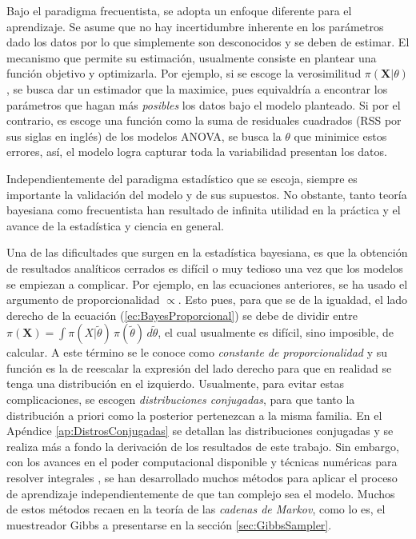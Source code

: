 \documentclass[../Main/Main.tex]{subfiles}
\begin{document}
Bajo el paradigma frecuentista, se adopta un enfoque diferente para el  aprendizaje. Se asume que no hay incertidumbre inherente en los parámetros dado los datos por lo que simplemente son desconocidos y se deben de estimar. El mecanismo que permite su estimación, usualmente consiste en plantear una función objetivo y optimizarla. Por ejemplo, si se escoge la verosimilitud $\pi(\mathbf{X}|\theta)$, se busca dar un estimador que la maximice, pues equivaldría a encontrar los parámetros que hagan más \textit{posibles} los datos bajo el modelo planteado. Si por el contrario, es escoge una función como la suma de residuales cuadrados (RSS por sus siglas en inglés) de los modelos ANOVA, se busca la $\theta$ que minimice estos errores, así, el modelo logra capturar toda la variabilidad presentan los datos. 

Independientemente del paradigma estadístico que se escoja, siempre es importante la validación del modelo y de sus supuestos. No obstante, tanto teoría bayesiana como frecuentista han resultado de infinita utilidad en la práctica y el avance de la estadística y ciencia en general.

Una de las dificultades que surgen en la estadística bayesiana, es que la obtención de resultados analíticos cerrados es difícil o muy tedioso una vez que los modelos se empiezan a complicar. Por ejemplo, en las ecuaciones anteriores, se ha usado el argumento de proporcionalidad $\propto$. Esto pues, para que se de la igualdad, el lado derecho de la ecuación (\ref{ec:BayesProporcional}) se debe de dividir entre $\pi(\mathbf{X}) = \int \pi(X|\tilde{\theta})\,\pi(\tilde{\theta})\,d\tilde{\theta}$, el cual usualmente es difícil, sino imposible, de calcular. A este término se le conoce como \textit{constante de proporcionalidad} y su función es la de reescalar la expresión del lado derecho para que en realidad se tenga una distribución en el izquierdo. Usualmente, para evitar estas complicaciones, se escogen \textit{distribuciones conjugadas}, para que tanto la distribución a priori como la posterior pertenezcan a la misma familia. En el Apéndice \ref{ap:DistrosConjugadas} se detallan las distribuciones conjugadas y se realiza más a fondo la derivación de los resultados de este trabajo. Sin embargo, con los avances en el poder computacional disponible y técnicas numéricas para resolver integrales \autocite{robert2004monte}, se han desarrollado muchos métodos para aplicar el proceso de aprendizaje independientemente de que tan complejo sea el modelo. Muchos de estos métodos recaen en la teoría de las \textit{cadenas de Markov}, como lo es, el muestreador Gibbs a presentarse en la sección \ref{sec:GibbsSampler}. 
\end{document}
